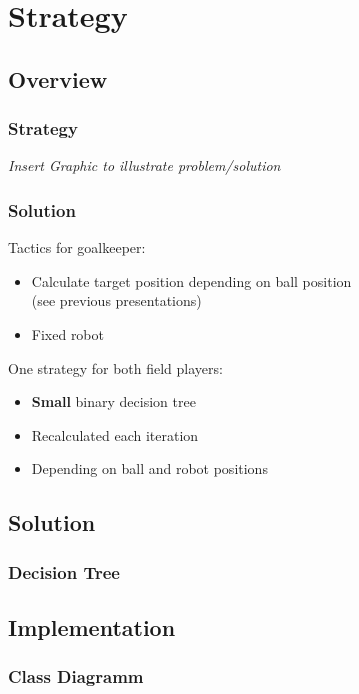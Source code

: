 \documentclass[hyperref={pdfpagelabels=false}]{beamer}
\begin{document}
\section{Strategy}
\subsection{Overview}
\begin{frame}
    \frametitle{Strategy}
    \textit{Insert Graphic to illustrate problem/solution}
\end{frame}

\begin{frame}
    \frametitle{Solution}
    Tactics for goalkeeper:\\
    \begin{itemize}
        \item Calculate target position depending on ball position\\
        (see previous presentations)
        \item Fixed robot
    \end{itemize}
    
    One strategy for both field players:\\
    \begin{itemize}
        \item \textbf{Small} binary decision tree
        \item Recalculated each iteration
        \item Depending on ball and robot positions
    \end{itemize}

\end{frame}

\subsection{Solution}
\begin{frame}
    \frametitle{Decision Tree}
    \begin{center}
        
    \end{center}
\end{frame}

\subsection{Implementation}
\begin{frame}
    \frametitle{Class Diagramm}
    \begin{center}
        
    \end{center}
\end{frame}
\end{document}
